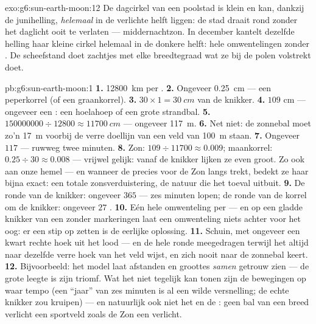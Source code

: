 \begin{solution}{exo:g6:sun-earth-moon:12}
De dagcirkel van een poolstad is klein en kan, dankzij de junihelling,
\emph{helemaal} in de verlichte helft liggen: de stad draait rond
zonder het daglicht ooit te verlaten --- middernachtzon. In december
kantelt dezelfde helling haar kleine cirkel helemaal in de donkere
helft: hele omwentelingen zonder . De scheefstand doet
zachtjes met elke breedtegraad wat ze bij de polen volstrekt doet.
\end{solution}

\begin{solution}{pb:g6:sun-earth-moon:1}
\textbf{1.} \qty{12800}{km} per .
\textbf{2.} Ongeveer \qty{0.25}{cm} --- een peperkorrel (of een
graankorrel).
\textbf{3.} $30 \times 1 = \qty{30}{cm}$ van de knikker.
\textbf{4.} $109$ cm --- ongeveer een : een hoelahoep of een
grote strandbal.
\textbf{5.} $150000000 \div 12800 \approx \qty{11700}{cm}$ ---
ongeveer \qty{117}{m}.
\textbf{6.} Net niet: de zonnebal moet zo'n \qty{17}{m} voorbij de
verre doellijn van een veld van \qty{100}{m} staan.
\textbf{7.} Ongeveer $117$  --- ruwweg twee minuten.
\textbf{8.} Zon: $109 \div 11700 \approx 0.009$; maankorrel:
$0.25 \div 30 \approx 0.008$ --- vrijwel gelijk: vanaf de knikker
lijken ze even groot. Zo ook aan onze hemel --- en wanneer de
 precies voor de Zon langs trekt, bedekt ze haar bijna exact: een
totale zonsverduistering, de natuur die het toeval uitbuit.
\textbf{9.} De ronde van de knikker: ongeveer $365$  --- zes
minuten lopen; de ronde van de korrel om de knikker: ongeveer $27$
.
\textbf{10.} Eén hele omwenteling per  --- en op een gladde
knikker van een  zonder markeringen laat een omwenteling
niets achter voor het oog: er een stip op zetten is de eerlijke
oplossing.
\textbf{11.} Schuin, met ongeveer een kwart rechte hoek uit het lood
--- en de hele ronde meegedragen terwijl het altijd naar dezelfde
verre hoek van het veld wijst, en zich nooit naar de zonnebal keert.
\textbf{12.} Bijvoorbeeld: het model laat afstanden en groottes
\emph{samen} getrouw zien --- de grote leegte is zijn triomf. Wat het
niet tegelijk kan tonen zijn de bewegingen op waar tempo (een ``jaar''
van zes minuten is al een wilde versnelling; de echte knikker zou
kruipen) --- en natuurlijk ook niet het  en de : geen bal
van een  breed verlicht een sportveld zoals de Zon een
 verlicht.
\end{solution}
